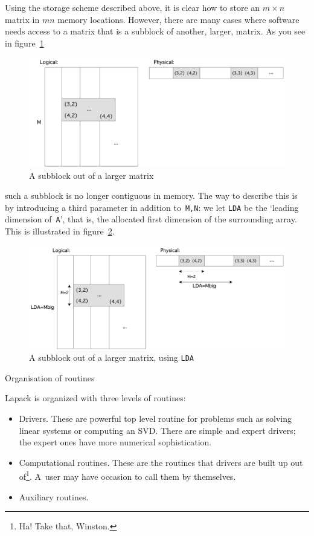 Using the storage scheme described above, it is clear how to store an
$m\times n$ matrix in $mn$ memory locations. However, there are many
cases where software needs access to a matrix that is a subblock of
another, larger, matrix. As you see in figure~\ref{fig:lda1}
\begin{figure}[ht]
  \includegraphics[scale=.14]{graphics-public/denselda}
  \caption{A subblock out of a larger matrix}
  \label{fig:lda1}
\end{figure}
such a subblock is no longer contiguous in memory. The way to describe
this is by introducing a third parameter in addition to~{\tt M,N}: we
let {\tt LDA} be the `leading dimension of~{\tt A}', that is, the
allocated first dimension of the surrounding array. This is
illustrated in figure~\ref{fig:lda2}.
\begin{figure}
  \includegraphics[scale=.14]{graphics-public/denselda2}
  \caption{A subblock out of a larger matrix, using {\tt LDA}}
  \label{fig:lda2}
\end{figure}

 {Organisation of routines}

Lapack is organized with three levels of routines:
\begin{itemize}
\item Drivers. These are powerful top level routine for problems such
  as solving linear systems or computing an SVD. There are simple and
  expert drivers; the expert ones have more numerical sophistication.
\item Computational routines. These are the routines that drivers are
  built up out of\footnote{Ha! Take that, Winston.}. A~user may have
  occasion to call them by themselves.
\item Auxiliary routines.
\end{itemize}

